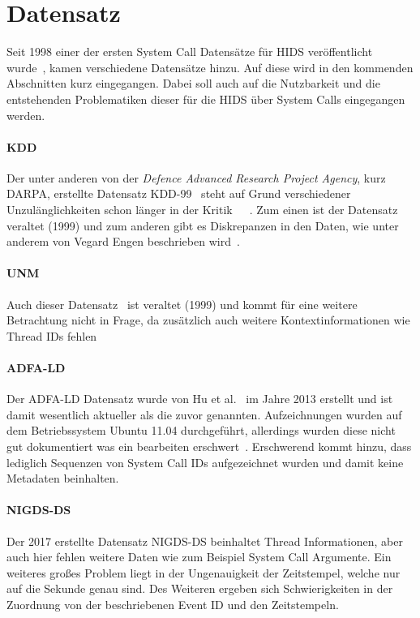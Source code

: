     \section{Datensatz}
    \label{sec:Datensatz}
        Seit 1998 einer der ersten System Call Datensätze für HIDS veröffentlicht wurde~\cite{DARPA},
        kamen verschiedene Datensätze hinzu.
        Auf diese wird in den kommenden Abschnitten kurz eingegangen.
        Dabei soll auch auf die Nutzbarkeit und die entstehenden Problematiken dieser für die HIDS über System Calls eingegangen werden.

        \paragraph{KDD}
            Der unter anderen von der \textit{Defence Advanced Research Project Agency}, kurz DARPA, erstellte Datensatz KDD-99~\cite{DARPA}
            steht auf Grund verschiedener Unzulänglichkeiten schon länger in der Kritik~\cite{KDD}~\cite{KDD2}~\cite{UNM}.
            Zum einen ist der Datensatz veraltet (1999) und zum anderen gibt es Diskrepanzen in den Daten, wie unter anderem von Vegard Engen beschrieben wird~\cite{KDD}.
        \paragraph{UNM}
            Auch dieser Datensatz~\cite{UNM} ist veraltet (1999) und kommt für eine weitere Betrachtung nicht in Frage,
            da zusätzlich auch weitere Kontextinformationen wie Thread IDs fehlen~\cite{UNMcritic}
        \paragraph{ADFA-LD}
            Der ADFA-LD Datensatz wurde von Hu et al.~\cite{UNMcritic} im Jahre 2013 erstellt und ist damit wesentlich aktueller als die zuvor genannten.
            Aufzeichnungen wurden auf dem Betriebssystem Ubuntu 11.04 durchgeführt, allerdings wurden diese nicht gut dokumentiert was ein bearbeiten erschwert~\cite{ADFA-LDcritic}.
            Erschwerend kommt hinzu, dass lediglich Sequenzen von System Call IDs aufgezeichnet wurden und damit keine Metadaten beinhalten.
        \paragraph{NIGDS-DS}
            Der 2017 erstellte Datensatz NIGDS-DS beinhaltet Thread Informationen, aber auch hier fehlen weitere Daten wie zum Beispiel System Call Argumente.
            Ein weiteres großes Problem liegt in der Ungenauigkeit der Zeitstempel, welche nur auf die Sekunde genau sind.
            Des Weiteren ergeben sich Schwierigkeiten in der Zuordnung von der beschriebenen Event ID und den Zeitstempeln.

